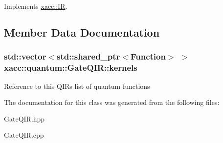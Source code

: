 Implements \hyperlink{a00041_a8356cdff1919b88eabeb84fd7450cdb6}{xacc\+::\+IR}.



\subsection{Member Data Documentation}
\subsubsection[{\texorpdfstring{kernels}{kernels}}]{\setlength{\rightskip}{0pt plus 5cm}std\+::vector$<$std\+::shared\+\_\+ptr$<${\bf Function}$>$ $>$ xacc\+::quantum\+::\+Gate\+Q\+I\+R\+::kernels\hspace{0.3cm}{\ttfamily [protected]}}\hypertarget{a00034_ae75a4af0ce455eee1ce316c16426a661}{}\label{a00034_ae75a4af0ce455eee1ce316c16426a661}
Reference to this Q\+IR\textquotesingle{}s list of quantum functions 

The documentation for this class was generated from the following files\+:\begin{DoxyCompactItemize}
\item 
Gate\+Q\+I\+R.\+hpp\item 
Gate\+Q\+I\+R.\+cpp\end{DoxyCompactItemize}
